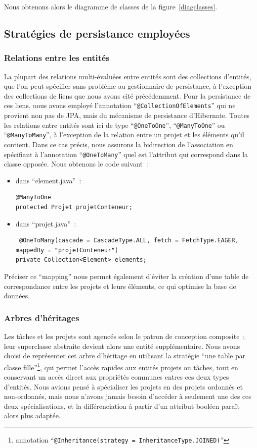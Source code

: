 \documentclass[a4paper, french, 11pt]{report}
\begin{document}
Nous obtenons alors le diagramme de classes de la figure~\ref{diagclasses}. 

\subsection{Stratégies de persistance employées}

\subsubsection{Relations entre les entités}
La plupart des relations multi-évaluées entre entités sont des collections d'entités, que l'on peut spécifier sans problème au gestionnaire de persistance, à l'exception des collections de liens que nous avons cité précédemment.
Pour la persistance de ces liens, nous avons employé l'annotation ``\texttt{@CollectionOfElements}'' qui ne provient non pas de JPA, mais du mécanisme de persistance d'Hibernate.
Toutes les relations entre entités sont ici de type ``\texttt{@OneToOne}'', ``\texttt{@ManyToOne}'' ou ``\texttt{@ManyToMany}'', à l'exception de la relation entre un projet et les éléments qu'il contient.
Dans ce cas précis, nous assurons la bidirection de l'association en spécifiant à l'annotation ``\texttt{@OneToMany}'' quel est l'attribut qui correspond dans la classe opposée.
Nous obtenons le code suivant~:
\begin{itemize}
\item dans ``element.java''~:
\begin{lstlisting}
@ManyToOne
protected Projet projetConteneur;
\end{lstlisting}
\item dans ``projet.java''~:
\begin{lstlisting}
 @OneToMany(cascade = CascadeType.ALL, fetch = FetchType.EAGER, mappedBy = "projetConteneur")
private Collection<Element> elements;
\end{lstlisting}
\end{itemize}
Préciser ce ``mapping'' nous permet également d'éviter la création d'une table de correspondance entre les projets et leurs éléments, ce qui optimise la base de données.

\subsubsection{Arbres d'héritages}
Les tâches et les projets sont agencés selon le patron de conception composite~; leur superclasse abstraite devient alors une entité supplémentaire.
Nous avons choisi de représenter cet arbre d'héritage en utilisant la stratégie ``une table par classe fille''\footnote{annotation ``\texttt{@Inheritance(strategy = InheritanceType.JOINED)}''}, qui permet l'accès rapides aux entités projets ou tâches, tout en conservant un accès direct aux propriétés communes entres ces deux types d'entités.
Nous avions pensé à spécialiser les projets en des projets ordonnés et non-ordonnés, mais nous n'avons jamais besoin d'accéder à seulement une des ces deux spécialisations, et la différenciation à partir d'un attribut booléen paraît alors plus adaptée.
\end{document}
